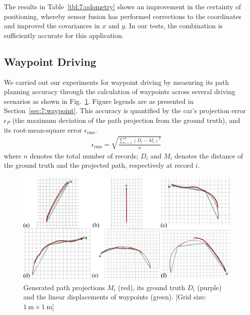 The results in Table~\ref{tbl:7:odometry} shows an improvement in the certainty of positioning, whereby sensor fusion has performed corrections to the coordinates and improved the covariances in $x$ and $y$. In our tests, the combination is sufficiently accurate for this application.

\subsection{Waypoint Driving}\label{sec:7:benchway}
We carried out our experiments for waypoint driving by measuring its path planning accuracy through the calculation of waypoints across several driving scenarios as shown in Fig.~\ref{fig:7:expwp}. Figure legends are as presented in Section~\ref{sec:7:waypoint}. This accuracy is quantified by the car's projection error $\epsilon_P$ (the maximum deviation of the path projection from the ground truth), and its root-mean-square error $\epsilon_\textrm{rms}$.
\begin{align}
\epsilon_\textrm{rms} = \sqrt{\frac{\sum\limits_{i=1}^{n} (D_i - M_i)^2}{n}}
\end{align}
where $n$ denotes the total number of records; $D_i$ and $M_i$ denotes the distance of the ground truth and the projected path, respectively at record $i$.  


\begin{figure}[H]
	\centering
	\includegraphics[width=\linewidth]{wp2}
	\caption[Generated path projections, ground truth and linear displacements]{Generated path projections $M_i$ (red), its ground truth $D_i$ (purple) and the linear displacements of waypoints (green). [Grid size: $\SI{1}{\meter}\times\SI{1}{\meter}$]}
	\label{fig:7:expwp}
\end{figure}

